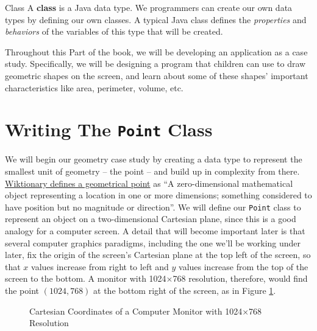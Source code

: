 \begin{defn}{Class}
    A \textbf{class} is a Java data type.  We programmers can create our own data types by defining our own classes.  A typical Java class defines the \textit{properties} and \textit{behaviors} of the variables of this type that will be created.
\end{defn}

Throughout this Part of the book, we will be developing an application as a case study.  Specifically, we will be designing a program that children can use to draw geometric shapes on the screen, and learn about some of these shapes' important characteristics like area, perimeter, volume, etc.

\section{Writing The \texttt{Point} Class}

We will begin our geometry case study by creating a data type to represent the smallest unit of geometry -- the point -- and build up in complexity from there.  \href{https://en.wiktionary.org/wiki/point}{Wiktionary defines a geometrical point} as ``A zero-dimensional mathematical object representing a location in one or more dimensions; something considered to have position but no magnitude or direction''.  We will define our \texttt{Point} class to represent an object on a two-dimensional Cartesian plane, since this is a good analogy for a computer screen.  A detail that will become important later is that several computer graphics paradigms, including the one we'll be working under later, fix the origin of the screen's Cartesian plane at the top left of the screen, so that $x$ values increase from right to left and $y$ values increase from the top of the screen to the bottom.  A monitor with 1024$\times$768 resolution, therefore, would find the point $(1024,768)$ at the bottom right of the screen, as in Figure \ref{fig:monitor}.

\begin{figure}
    \color{nccblue}
    \begin{center}
    \end{center}
    \caption{Cartesian Coordinates of a Computer Monitor with 1024$\times$768 Resolution}
    \label{fig:monitor}
\end{figure}

